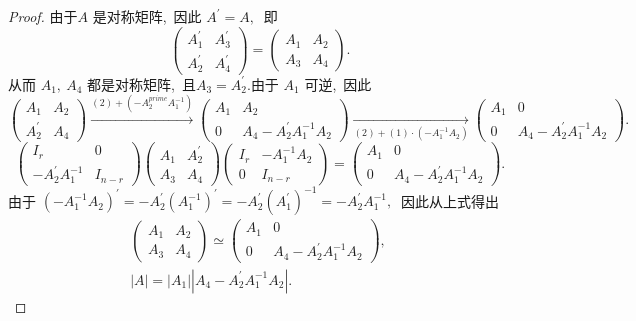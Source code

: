 \begin{proof}
	由于$  A $ 是对称矩阵,\  因此 $ A^{\prime}=A ,\ $ 即
	$$\left(\begin{array}{ll}
		A_{1}^{\prime} & A_{3}^{\prime} \\
		A_{2}^{\prime} & A_{4}^{\prime}
	\end{array}\right)=\left(\begin{array}{ll}
		A_{1} & A_{2} \\
		A_{3} & A_{4}
	\end{array}\right) .$$
	从而 $ A_{1},\  A_{4}$  都是对称矩阵,\  且$  A_{3}=A_{2}^{\prime} .$由于 $ A_{1}$  可逆,\  因此
	$$\left(\begin{array}{ll}
		A_{1} & A_{2} \\
		A_{2}^{\prime} & A_{4}
	\end{array}\right) \xrightarrow{(2)+(-A_2^{prime}A_1^{-1})}\left(\begin{array}{cc}
		A_{1} & A_{2} \\
		0 	  & A_{4}-A_{2}^{\prime} A_{1}^{-1} A_{2}
	\end{array}\right)\xrightarrow[(2)+(1)\cdot(-A_1^{-1}A_2)]{}\left(\begin{array}{cc}
		A_{1} & 0 \\
		0 & A_{4}-A_{2}^{\prime} A_{1}^{-1} A_{2}
	\end{array}\right).$$
	$$\left(\begin{array}{cc}
		I_{r} & 0 \\
		-A_{2}^{\prime} A_{1}^{-1} & I_{n-r}
	\end{array}\right)\left(\begin{array}{ll}
		A_{1} & A_{2}^{\prime} \\
		A_{3} & A_{4}
	\end{array}\right)\left(\begin{array}{cc}
		I_{r} & -A_{1}^{-1} A_{2} \\
		0 & I_{n-r}
	\end{array}\right)=\left(\begin{array}{cc}
		A_{1} & 0 \\
		0 & A_{4}-A_{2}^{\prime} A_{1}^{-1} A_{2}
	\end{array}\right) .$$
	由于 $ \left(-A_{1}^{-1} A_{2}\right)^{\prime}=-A_{2}^{\prime}\left(A_{1}^{-1}\right)^{\prime}=-A_{2}^{\prime}\left(A_{1}^{\prime}\right)^{-1}=-A_{2}^{\prime} A_{1}^{-1} ,\ $ 因此从上式得出
	$$\begin{array}{c}
		{\left(\begin{array}{ll}
				A_{1} & A_{2} \\
				A_{3} & A_{4}
			\end{array}\right)\simeq\left(\begin{array}{cc}
				A_{1} & 0 \\
				0 & A_{4}-A_{2}^{\prime} A_{1}^{-1} A_{2}
			\end{array}\right),\ } \\
		|A|=\left|A_{1}\right|\left|A_{4}-A_{2}^{\prime} A_{1}^{-1} A_{2}\right| .
	\end{array}$$
\end{proof}
